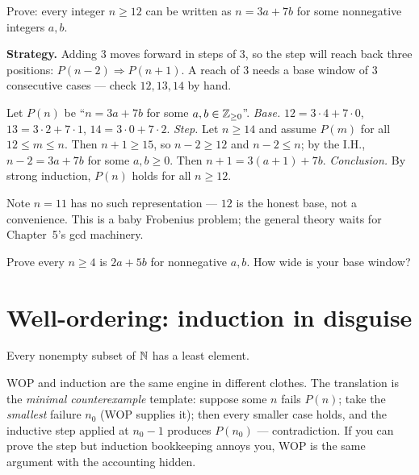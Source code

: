 \begin{example}[Postage]\label{ex:postage}
Prove: every integer $n \ge 12$ can be written as $n = 3a + 7b$ for some
nonnegative integers $a, b$.
\par\smallskip
\textbf{Strategy.} Adding $3$ moves forward in steps of $3$, so the step will
reach back three positions: $P(n-2) \Rightarrow P(n+1)$. A reach of $3$ needs
a base window of $3$ consecutive cases --- check $12, 13, 14$ by hand.
\par\smallskip
\begin{solution}
Let $P(n)$ be ``$n = 3a + 7b$ for some $a, b \in \mathbb{Z}_{\ge 0}$''.
\emph{Base.} $12 = 3\cdot 4 + 7\cdot 0$, $13 = 3\cdot 2 + 7\cdot 1$,
$14 = 3\cdot 0 + 7\cdot 2$.
\emph{Step.} Let $n \ge 14$ and assume $P(m)$ for all $12 \le m \le n$. Then
$n+1 \ge 15$, so $n - 2 \ge 12$ and $n - 2 \le n$; by the I.H.,
$n - 2 = 3a + 7b$ for some $a, b \ge 0$. Then $n + 1 = 3(a+1) + 7b$.
\emph{Conclusion.} By strong induction, $P(n)$ holds for all $n \ge 12$.
\end{solution}
\end{example}

Note $n=11$ has no such representation --- $12$ is the honest base, not a
convenience. This is a baby Frobenius problem; the general theory waits for
Chapter~5's gcd machinery.

\begin{exercise}[medium]\label{exr:postage}
Prove every $n \ge 4$ is $2a + 5b$ for nonnegative $a,b$. How wide is your
base window?
\end{exercise}

\section{Well-ordering: induction in disguise}\label{sec:wop}

\begin{definition}
Every nonempty subset of $\mathbb{N}$ has a least element.
\end{definition}

WOP and induction are the same engine in different clothes. The translation is
the \emph{minimal counterexample} template:
suppose some $n$ fails $P(n)$; take the \emph{smallest} failure $n_0$ (WOP
supplies it); then every smaller case holds, and the inductive step applied at
$n_0 - 1$ produces $P(n_0)$ --- contradiction. If you can prove the step but
induction bookkeeping annoys you, WOP is the same argument with the accounting
hidden.

